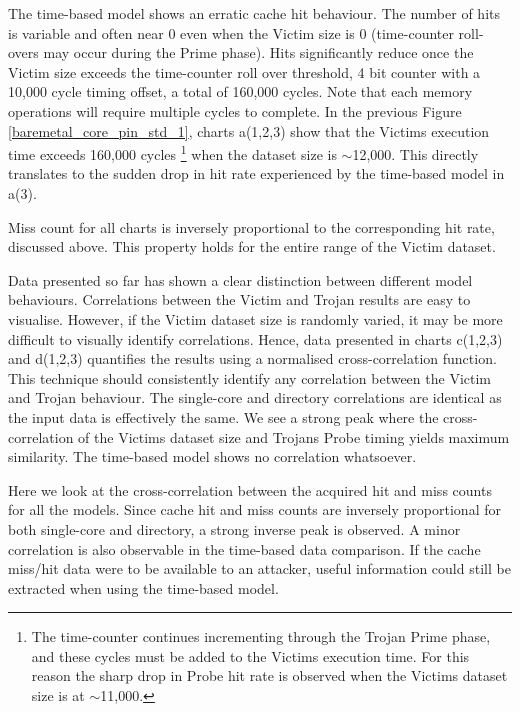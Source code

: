 \begin{description}
						The time-based model shows an erratic cache hit behaviour. The number of hits is variable and often near 0 even when the Victim size is 0 (time-counter roll-overs may occur during the Prime phase). Hits significantly reduce once the Victim size exceeds the time-counter roll over threshold, 4 bit counter with a 10,000 cycle timing offset, a total of 160,000 cycles. Note that each memory operations will require multiple cycles to complete. In the previous Figure \ref{baremetal_core_pin_std_1}, charts a(1,2,3) show that the Victims execution time exceeds 160,000 cycles 
						\footnote{The time-counter continues incrementing through the Trojan Prime phase, and these cycles must be added to the Victims execution time. For this reason the sharp drop in Probe hit rate is observed when the Victims dataset size is at $\sim$11,000.}
						when the dataset size is $\sim$12,000. This directly translates to the sudden drop in hit rate experienced by the time-based model in a(3).
					\item [b(1,2,3)] 
						Miss count for all charts is inversely proportional to the corresponding hit rate, discussed above. This property holds for the entire range of the Victim dataset.
					\item [c(1,2,3)] 
						Data presented so far has shown a clear distinction between different model behaviours. Correlations between the Victim and Trojan results are easy to visualise. However, if the Victim dataset size is randomly varied, it may be more difficult to visually identify correlations. Hence, data presented in charts c(1,2,3) and d(1,2,3) quantifies the results using a normalised cross-correlation function. This technique should consistently identify any correlation between the Victim and Trojan behaviour. The single-core and directory correlations are identical as the input data is effectively the same. We see a strong peak where the cross-correlation of the Victims dataset size and Trojans Probe timing yields maximum similarity. The time-based model shows no correlation whatsoever.
					\item [d(1,2,3)]
						Here we look at the cross-correlation between the acquired hit and miss counts for all the models. Since cache hit and miss counts are inversely proportional for both single-core and directory, a strong inverse peak is observed. A minor correlation is also observable in the time-based data comparison. If the cache miss/hit data were to be available to an attacker, useful information could still be extracted when using the time-based model.
					\end{description}

